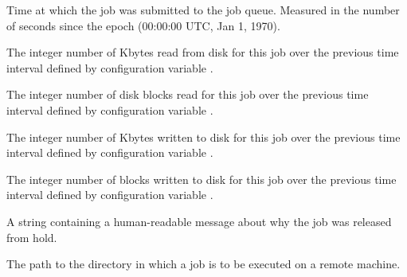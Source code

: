 \begin{description}
\item[\AdAttr{QDate}:]  Time at which the job was submitted to the job
queue.  Measured in the
number of seconds since the epoch (00:00:00 UTC, Jan 1, 1970).

\item[\AdAttr{RecentBlockReadKbytes}:] The integer number of Kbytes
read from disk for this job over the previous time interval defined
by configuration variable .

\item[\AdAttr{RecentBlockReads}:] The integer number of disk blocks
read for this job over the previous time interval defined
by configuration variable .

\item[\AdAttr{RecentBlockWriteKbytes}:] The integer number of Kbytes
written to disk for this job over the previous time interval defined
by configuration variable .

\item[\AdAttr{RecentBlockWrites}:] The integer number of blocks
written to disk for this job over the previous time interval defined
by configuration variable .

\item[\AdAttr{ReleaseReason}:]     A string containing a human-readable
message about why the job was released from hold.

\item[\AdAttr{RemoteIwd}:]  The path to the directory in which
a job is to be executed on a remote machine.


\end{description}

